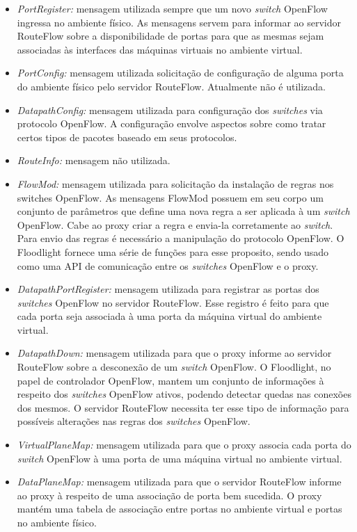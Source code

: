 \begin{itemize}
\item \textit{PortRegister:} mensagem utilizada sempre que um
novo \textit{switch} OpenFlow ingressa no ambiente físico. As mensagens 
servem para informar ao servidor RouteFlow sobre a disponibilidade
de portas para que as mesmas sejam associadas às interfaces
das máquinas virtuais no ambiente virtual.
\item \textit{PortConfig:} mensagem utilizada solicitação de 
configuração de alguma porta do ambiente físico pelo servidor
RouteFlow. Atualmente não é utilizada.
\item \textit{DatapathConfig:} mensagem utilizada para
configuração dos \textit{switches} via protocolo OpenFlow. A 
configuração envolve aspectos sobre como tratar certos tipos
de pacotes baseado em seus protocolos.
\item \textit{RouteInfo:} mensagem não utilizada.
\item \textit{FlowMod:} mensagem utilizada para 
solicitação da instalação de regras nos switches 
OpenFlow. As mensagens FlowMod possuem em seu 
corpo um conjunto de parâmetros que define uma nova regra 
a ser aplicada à um \textit{switch} OpenFlow. Cabe ao proxy 
criar a regra e envia-la corretamente ao \textit{switch}. 
Para envio das regras é necessário a manipulação do 
protocolo OpenFlow. O Floodlight fornece uma série de 
funções para esse proposito, sendo usado como uma 
API de comunicação entre os \textit{switches} OpenFlow e o 
proxy.
\item \textit{DatapathPortRegister:} mensagem utilizada 
para registrar as portas dos \textit{switches} OpenFlow 
no servidor RouteFlow. Esse registro é feito para que cada 
porta seja associada à uma porta da máquina 
virtual do ambiente virtual.
\item \textit{DatapathDown:} mensagem utilizada para que 
o proxy informe ao servidor RouteFlow sobre a 
desconexão de um \textit{switch} OpenFlow. O Floodlight, no papel 
de controlador OpenFlow, mantem um conjunto de 
informações à respeito dos \textit{switches} OpenFlow ativos, 
podendo detectar quedas nas conexões dos mesmos. O 
servidor RouteFlow necessita ter esse tipo de informação para 
possíveis alterações nas regras dos 
\textit{switches} OpenFlow.
\item \textit{VirtualPlaneMap:} mensagem utilizada para que 
o proxy associa cada porta do \textit{switch} 
OpenFlow à uma porta de uma máquina virtual no ambiente 
virtual.
\item \textit{DataPlaneMap:} mensagem utilizada para que o 
servidor RouteFlow informe ao proxy à 
respeito de uma associação de porta bem sucedida. O proxy 
mantém uma tabela de associação entre portas 
no ambiente virtual e portas no ambiente físico.
\end{itemize}

